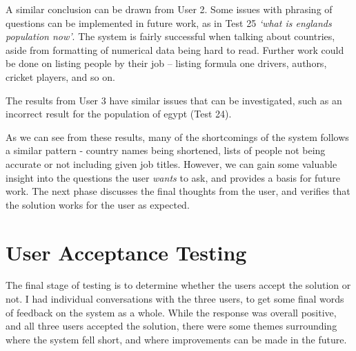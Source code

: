 A similar conclusion can be drawn from User 2. Some issues with phrasing of questions can be implemented in future work, as in Test 25 {\it `what is englands population now'}. The system is fairly successful when talking about countries, aside from formatting of numerical data being hard to read. Further work could be done on listing people by their job -- listing formula one drivers, authors, cricket players, and so on.

The results from User 3 have similar issues that can be investigated, such as an incorrect result for the population of egypt (Test 24).

As we can see from these results, many of the shortcomings of the system follows a similar pattern - country names being shortened, lists of people not being accurate or not including given job titles. However, we can gain some valuable insight into the questions the user {\it wants} to ask, and provides a basis for future work. The next phase discusses the final thoughts from the user, and verifies that the solution works for the user as expected.

\section{User Acceptance Testing}
\label{sec:uat}
The final stage of testing is to determine whether the users accept the solution or not. I had individual conversations with the three users, to get some final words of feedback on the system as a whole. While the response was overall positive, and all three users accepted the solution, there were some themes surrounding where the system fell short, and where improvements can be made in the future.

